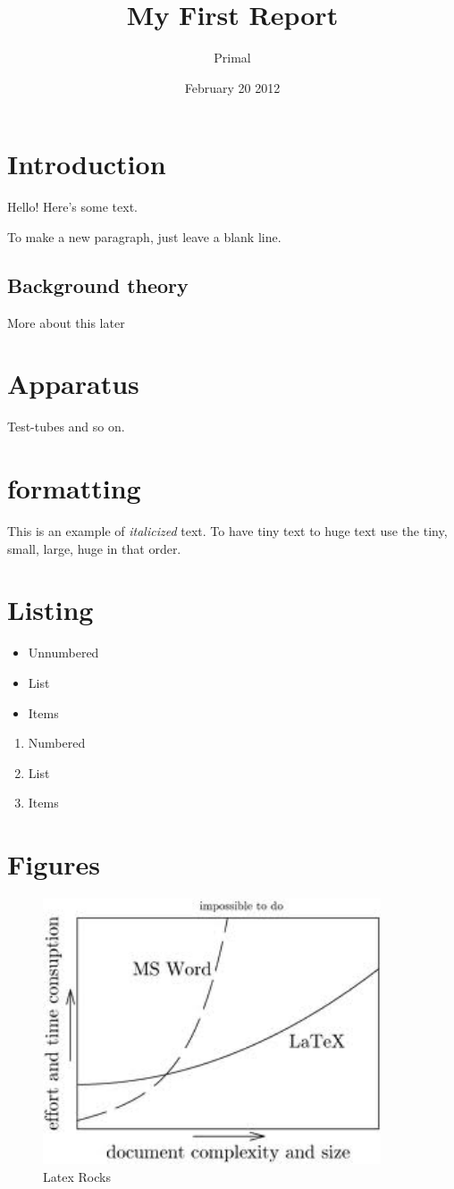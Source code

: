 \documentclass{article} %
\title{My First Report}
\author{Primal}
\date{February 20 2012}
\begin{document}
\maketitle %
\tableofcontents %
\section{Introduction}
Hello!  Here's some text.

To make a new paragraph, just leave a blank line.

\subsection{Background theory}
More about this later

\section{Apparatus}
Test-tubes and so on.

\section{formatting}
This is an example of \textit{italicized} text. To have 
tiny {\tiny text} to huge {\huge text} use the tiny, small, large,
huge in that order.

\section{Listing}

\begin{itemize}
\item Unnumbered
\item List 
\item Items
\end{itemize}

\begin{enumerate}
\item Numbered
\item List 
\item Items
\end{enumerate}


\section{Figures}
\begin{figure}[htbp]
\includegraphics[width=10cm]{latex.jpeg}
\caption{Latex Rocks}
\label{LATEX}
\end{figure}
\end{document}
